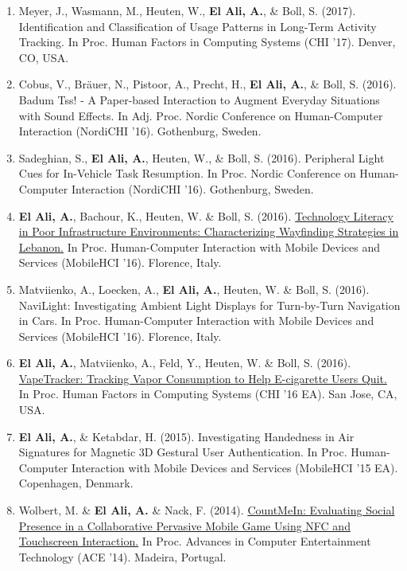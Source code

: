 \documentclass{article}
\begin{document}
\begin{enumerate}
\item Meyer, J., Wasmann, M., Heuten, W.,  \textbf{El Ali, A.}, \& Boll, S. (2017). Identification and Classification of Usage Patterns in Long-Term Activity Tracking. In Proc. Human Factors in Computing Systems (CHI '17). Denver, CO, USA.

\item Cobus, V., Br\"{a}uer, N., Pistoor, A., Precht, H.,  \textbf{El Ali, A.}, \& Boll, S. (2016). Badum Tss! - A Paper-based Interaction to Augment Everyday Situations with Sound Effects. In Adj. Proc. Nordic Conference on Human-Computer Interaction (NordiCHI '16). Gothenburg, Sweden.

\item Sadeghian, S.,  \textbf{El Ali, A.}, Heuten, W., \& Boll, S. (2016). Peripheral Light Cues for In-Vehicle Task Resumption. In Proc. Nordic Conference on Human-Computer Interaction (NordiCHI '16). Gothenburg, Sweden.

\item \textbf{El Ali, A.}, Bachour, K., Heuten, W. \& Boll, S. (2016). \href{http://abdoelali.com/pdfs/mobilehci2016_el_ali_preprint.pdf}{Technology Literacy in Poor Infrastructure Environments: Characterizing Wayfinding Strategies in Lebanon.} In Proc. Human-Computer Interaction with Mobile Devices and Services (MobileHCI '16). Florence, Italy. 

\item Matviienko, A., Loecken, A., \textbf{El Ali, A.}, Heuten, W. \& Boll, S. (2016). NaviLight: Investigating Ambient Light Displays for Turn-by-Turn Navigation in Cars. In Proc. Human-Computer Interaction with Mobile Devices and Services (MobileHCI '16). Florence, Italy. 

\item \textbf{El Ali, A.}, Matviienko, A., Feld, Y., Heuten, W. \& Boll, S. (2016). \href{http://abdoelali.com/pdfs/CHI16_lbw_vapetracker_camready}{VapeTracker: Tracking Vapor Consumption to Help E-cigarette Users Quit.} In Proc. Human Factors in Computing Systems (CHI '16 EA). San Jose, CA, USA.

\item  \textbf{El Ali, A.}, \& Ketabdar, H. (2015). Investigating Handedness in Air Signatures for Magnetic 3D Gestural User Authentication. In Proc. Human-Computer Interaction with Mobile Devices and Services (MobileHCI '15 EA). Copenhagen, Denmark.

\item Wolbert, M. \&  \textbf{El Ali, A.} \& Nack, F. (2014). \href{http://abdoelali.com/pdfs/CountMeIn_preprint.pdf}{CountMeIn: Evaluating Social Presence in a Collaborative Pervasive Mobile Game Using NFC and Touchscreen Interaction.} In Proc. Advances in Computer Entertainment Technology (ACE '14). Madeira, Portugal.


\end{enumerate}
\end{document}
